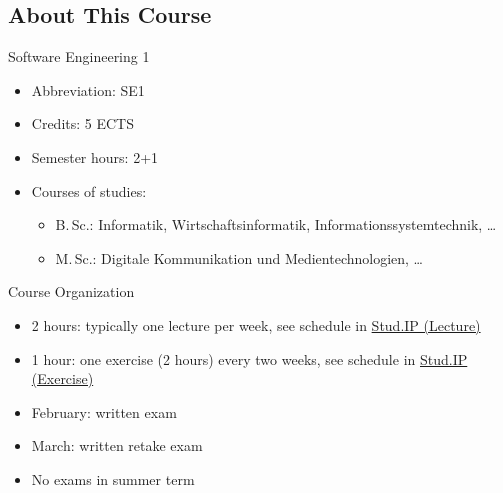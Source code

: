 \newcommand{\StudIPLectureLink}{https://studip.tu-braunschweig.de/dispatch.php/course/details?sem_id=8fa526030e67f6d8e691f934c2e256cd&again=yes}
\newcommand{\StudIPExerciseLink}{https://studip.tu-braunschweig.de/dispatch.php/course/details?sem_id=4b34a635107cde7ef107e91137838beb&again=yes}
\newcommand{\StudIPLecture}{\href{\StudIPLectureLink}{Stud.IP (Lecture)}}
\newcommand{\StudIPExercise}{\href{\StudIPExerciseLink}{Stud.IP (Exercise)}}

\subsection{About This Course} 
\begin{frame}{\insertsubsection}
	\begin{fancycolumns}
		\begin{definition}{Software Engineering 1}
			\begin{itemize}
				\item Abbreviation: SE1
				\item Credits: 5 ECTS %
				\item Semester hours: 2+1
				\item Courses of studies:
				\begin{itemize}
					\item B.\,Sc.: Informatik, Wirtschaftsinformatik, Informationssystemtechnik, \ldots
					\item M.\,Sc.: Digitale Kommunikation und Medientechnologien, \ldots
				\end{itemize}
			\end{itemize}
		\end{definition}
		\nextcolumn
		\begin{definition}{Course Organization}
			\begin{itemize}
				\item 2 hours: typically one lecture per week, see schedule in \StudIPLecture
				\item 1 hour: one exercise (2 hours) every two weeks, see schedule in \StudIPExercise
				\item February: written exam
				\item March: written retake exam
				\item No exams in summer term
			\end{itemize}
		\end{definition}
	\end{fancycolumns}
\end{frame}

